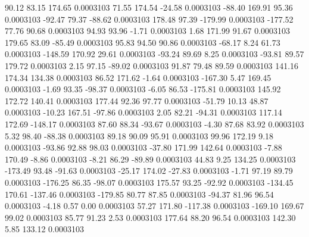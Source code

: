        90.12       83.15      174.65     0.0003103
       71.55      174.54      -24.58     0.0003103
      -88.40      169.91       95.36     0.0003103
      -92.47       79.37      -88.62     0.0003103
      178.48       97.39     -179.99     0.0003103
     -177.52       77.76       90.68     0.0003103
       94.93       93.96       -1.71     0.0003103
        1.68      171.99       91.67     0.0003103
      179.65       83.09      -85.49     0.0003103
       95.83       94.50       90.86     0.0003103
      -68.17        8.24       61.73     0.0003103
     -148.59      170.92       29.61     0.0003103
      -93.24       89.69        8.25     0.0003103
      -93.81       89.57      179.72     0.0003103
        2.15       97.15      -89.02     0.0003103
       91.87       79.48       89.59     0.0003103
      141.16      174.34      134.38     0.0003103
       86.52      171.62       -1.64     0.0003103
     -167.30        5.47      169.45     0.0003103
       -1.69       93.35      -98.37     0.0003103
       -6.05       86.53     -175.81     0.0003103
      145.92      172.72      140.41     0.0003103
      177.44       92.36       97.77     0.0003103
      -51.79       10.13       48.87     0.0003103
      -10.23      167.51      -97.86     0.0003103
        2.05       82.21      -94.31     0.0003103
      117.14      172.69     -148.17     0.0003103
       87.60       88.34      -93.67     0.0003103
       -4.30       87.68       83.92     0.0003103
        5.32       98.40      -88.38     0.0003103
       89.18       90.09       95.91     0.0003103
       99.96      172.19        9.18     0.0003103
      -93.86       92.88       98.03     0.0003103
      -37.80      171.99      142.64     0.0003103
       -7.88      170.49       -8.86     0.0003103
       -8.21       86.29      -89.89     0.0003103
       44.83        9.25      134.25     0.0003103
     -173.49       93.48      -91.63     0.0003103
      -25.17      174.02      -27.83     0.0003103
       -1.71       97.19       89.79     0.0003103
     -176.25       86.35      -98.07     0.0003103
      175.57       93.25      -92.92     0.0003103
     -134.45      170.61     -137.46     0.0003103
     -179.85       80.77       87.85     0.0003103
      -94.37       81.96       96.54     0.0003103
       -4.18        0.57        0.00     0.0003103
       57.27      171.80     -117.38     0.0003103
     -169.10      169.67       99.02     0.0003103
       85.77       91.23        2.53     0.0003103
      177.64       88.20       96.54     0.0003103
      142.30        5.85      133.12     0.0003103
